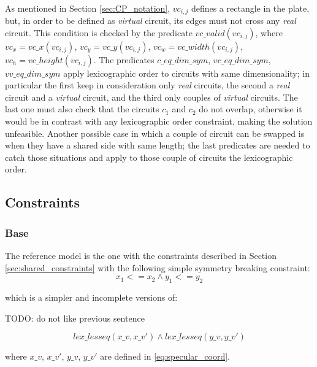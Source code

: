 \hfill \\
As mentioned in Section \ref{sec:CP_notation}, $vc_{i,j}$ defines a rectangle in the plate, but, in order to
be defined as \textit{virtual} circuit, its edges must not cross any \textit{real} circuit.
This condition is checked by the predicate $vc\_valid(vc_{i,j})$, where
$vc_x = vc\_x(vc_{i,j})$, $vc_y = vc\_y(vc_{i,j})$, $vc_w = vc\_width(vc_{i,j})$, $vc_h = vc\_height(vc_{i,j})$.
The predicates $c\_eq\_dim\_sym$, $vc\_eq\_dim\_sym$, $vv\_eq\_dim\_sym$ apply
lexicographic order to circuits with same dimensionality; in particular the first keep in consideration only
\textit{real} circuits, the second a \textit{real} circuit and a \textit{virtual} circuit, and the third only couples of
\textit{virtual} circuits. The last one must also check that the circuits $c_1$ and $c_2$ do not overlap,
otherwise it would be in contrast with any lexicographic order constraint, making the solution unfeasible.
Another possible case in which a couple of circuit can be swapped is when they have a shared side with same length;
the last predicates are needed to catch those situations and apply to those couple of circuits the lexicographic order.


\subsection{Constraints}
\subsubsection{Base} \label{sec:CP_base}
The reference model is the one with the constraints described in Section \ref{sec:shared_constraints}
with the following simple symmetry breaking constraint:
\begin{equation*}
  x_1 <= x_2 \land y_1 <= y_2
\end{equation*}

which is a simpler and incomplete versions of:

\colorbox{BurntOrange}{TODO: do not like previous sentence}

\begin{equation*}
  lex\_lesseq(x\_v, x\_v') \land lex\_lesseq(y\_v, y\_v')
\end{equation*}

where $x\_v$, $x\_v'$, $y\_v$, $y\_v'$ are defined in \ref{eq:specular_coord}.

